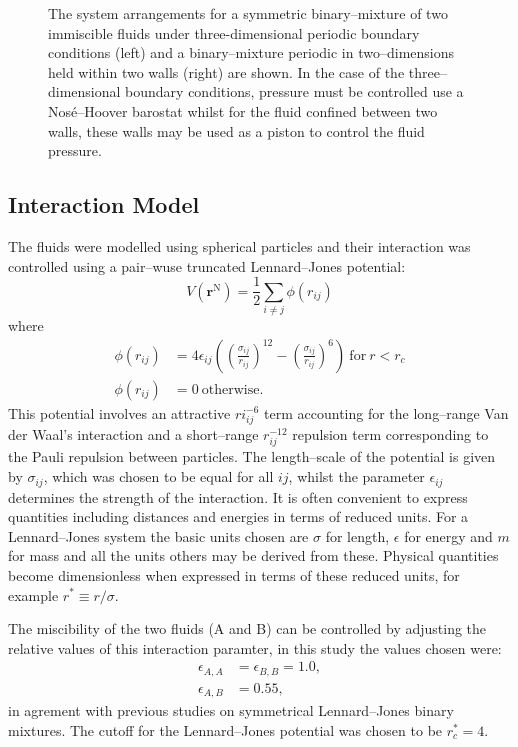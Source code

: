 \begin{figure}[h]
\caption{The system arrangements for a symmetric binary--mixture of two immiscible fluids under three-dimensional periodic boundary conditions (left) and a binary--mixture periodic in two--dimensions held within two walls (right) are shown. 
In the case of the three--dimensional boundary conditions, pressure must be controlled use a Nos\'{e}--Hoover barostat whilst for the fluid confined between two walls, these walls may be used as a piston to control the fluid pressure.}
\label{SetUp}
\end{figure}

\subsection{Interaction Model}
The fluids were modelled using spherical particles and their interaction was controlled using a pair--wuse truncated Lennard--Jones potential:
\begin{equation}
V \left( \mathbf{r}^{\mathrm{N}} \right) = \frac{1}{2} \sum_{i\neq j} \phi \left( r_{ij} \right)
\end{equation}
where
\begin{align}
\label{LJ}
\phi \left( r_{ij} \right) &= 4 \epsilon_{ij} \left( \left( \frac{\sigma_{ij}}{r_{ij}}\right)^{12} - \left( \frac{\sigma_{ij}}{r_{ij}}\right)^{6} \right)\ \mathrm{for}\ r < r_{c}\\
\phi \left( r_{ij} \right) &= 0\ \mathrm{otherwise}.
\end{align}
This potential involves an attractive $ri_{ij}^{-6}$ term accounting for the long--range Van der Waal's interaction and a short--range $r_{ij}^{-12}$ repulsion term corresponding to the Pauli repulsion between particles.
The length--scale of the potential is given by $\sigma_{ij}$, which was chosen to be equal for all $ij$, whilst the parameter $\epsilon_{ij}$ determines the strength of the interaction. 
It is often convenient to express quantities including distances and energies in terms of reduced units.
For a Lennard--Jones system the basic units chosen are $\sigma$ for length, $\epsilon$ for energy and $m$ for mass and all the units others may be derived from these.\cite{FrenkelSmit}
Physical quantities become dimensionless when expressed in terms of these reduced units, for example $r^{*} \equiv r / \sigma$.

The miscibility of the two fluids (A and B) can be controlled by adjusting the relative values of this interaction paramter, in this study the values chosen were:
\begin{align}
\epsilon_{A,A} &= \epsilon_{B,B} = 1.0,\\
\epsilon_{A,B} &= 0.55,
\end{align}
in agrement with previous studies on symmetrical Lennard--Jones binary mixtures.\cite{MorenzoRazo,Blas,HolgerBoppHampe}
The cutoff for the Lennard--Jones potential was chosen to be $r_{c}^{*} = 4$.

